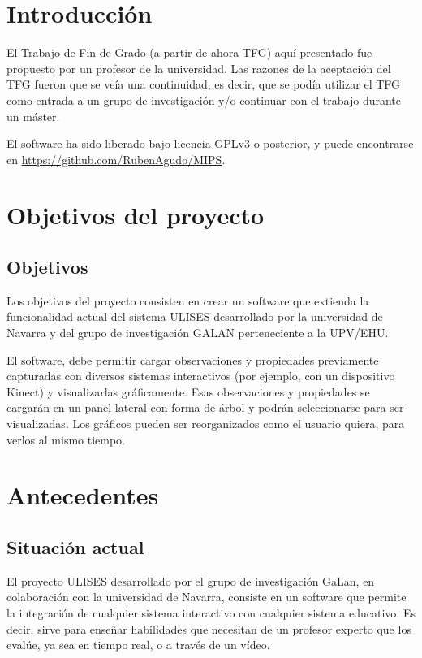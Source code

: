 \documentclass[12pt, a4paper]{report}
\begin{document}


\chapter{Introducci\'on}
El Trabajo de Fin de Grado (a partir de ahora TFG) aqu\'{i} presentado fue 
propuesto por un profesor de la universidad. Las razones de la aceptaci\'{o}n 
del TFG fueron que se ve\'{i}a una continuidad, es decir, que se pod\'{i}a 
utilizar el TFG como entrada a un grupo de investigaci\'{o}n y/o continuar con 
el trabajo durante un m\'{a}ster.

El software ha sido liberado bajo licencia GPLv3 o posterior, y puede 
encontrarse en \url{https://github.com/RubenAgudo/MIPS}.

\chapter{Objetivos del proyecto}
\section{Objetivos}
Los objetivos del proyecto consisten en crear un software que extienda la 
funcionalidad actual del sistema ULISES desarrollado 
por la universidad de Navarra y del grupo de investigación GALAN perteneciente 
a la UPV/EHU.

El software, debe permitir cargar observaciones y propiedades previamente 
capturadas con diversos
sistemas interactivos (por ejemplo, con un dispositivo Kinect) y
visualizarlas gr\'aficamente. Esas observaciones y propiedades se cargar\'an en 
un panel lateral con forma de \'arbol
y podr\'an seleccionarse para ser visualizadas. Los gr\'aficos pueden ser 
reorganizados como el
usuario quiera, para verlos al mismo tiempo.

\chapter{Antecedentes}
\section{Situaci\'on actual}
El proyecto ULISES desarrollado por el grupo de investigaci\'on GaLan, en 
colaboraci\'on con la universidad de Navarra, consiste en un software que 
permite la integraci\'on de cualquier sistema interactivo con cualquier sistema 
educativo. Es decir, sirve para ense\~nar habilidades que necesitan de un 
profesor experto que los eval\'ue, ya sea en tiempo real, o a trav\'es de un 
v\'ideo.
\end{document}
